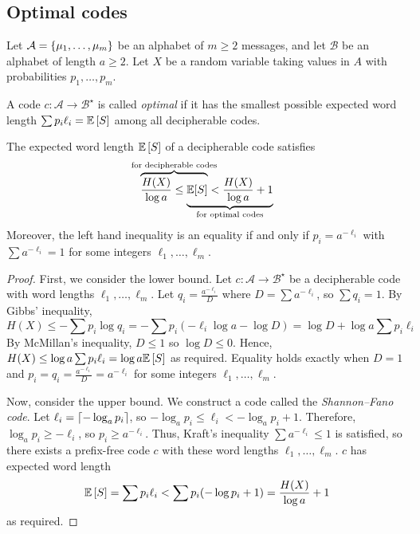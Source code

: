 \subsection{Optimal codes}
Let \( \mathcal A = \qty{\mu_1, \dots, \mu_m} \) be an alphabet of \( m \geq 2 \) messages, and let \( \mathcal B \) be an alphabet of length \( a \geq 2 \).
Let \( X \) be a random variable taking values in \( A \) with probabilities \( p_1, \dots, p_m \).
\begin{definition}
    A code \( c \colon \mathcal A \to \mathcal B^\star \) is called \emph{optimal} if it has the smallest possible expected word length \( \sum p_i \ell_i = \mathbb{E}\left[{S}\right] \) among all decipherable codes.
\end{definition}
\begin{theorem}
    The expected word length \( \mathbb{E}\left[{S}\right] \) of a decipherable code satisfies
    \[ \rlap{\(\overbrace{\phantom{\frac{H(X)}{\log a} \leq \mathbb E[S]}}^{\mathclap{\text{for decipherable codes}}}\)} \frac{H(X)}{\log a} \leq \underbrace{\mathbb E[S] < \frac{H(X)}{\log a} + 1}_{\mathclap{\text{for optimal codes}}} \]
    Moreover, the left hand inequality is an equality if and only if \( p_i = a^{-\ell_i} \) with \( \sum a^{-\ell_i} = 1 \) for some integers \( \ell_1, \dots, \ell_m \).
\end{theorem}
\begin{proof}
    First, we consider the lower bound.
    Let \( c \colon \mathcal A \to \mathcal B^\star \) be a decipherable code with word lengths \( \ell_1, \dots, \ell_m \).
    Let \( q_i = \frac{a^{-\ell_i}}{D} \) where \( D = \sum a^{-\ell_i} \), so \( \sum q_i = 1 \).
    By Gibbs' inequality,
    \[ H(X) \leq -\sum p_i \log q_i = -\sum p_i(-\ell_i \log a - \log D) = \log D + \log a \sum p_i \ell_i \]
    By McMillan's inequality, \( D \leq 1 \) so \( \log D \leq 0 \).
    Hence, \( H(X) \leq \log a \sum p_i \ell_i = \log a \mathbb{E}\left[{S}\right] \) as required.
    Equality holds exactly when \( D = 1 \) and \( p_i = q_i = \frac{a^{-\ell_i}}{D} = a^{-\ell_i} \) for some integers \( \ell_1, \dots, \ell_m \).

    Now, consider the upper bound.
    We construct a code called the \emph{Shannon--Fano code}.
    Let \( \ell_i = \lceil-\log_a p_i\rceil \), so \( -\log_a p_i \leq \ell_i < -\log_a p_i + 1 \).
    Therefore, \( \log_a p_i \geq -\ell_i \), so \( p_i \geq a^{-\ell_i} \).
    Thus, Kraft's inequality \( \sum a^{-\ell_i} \leq 1 \) is satisfied, so there exists a prefix-free code \( c \) with these word lengths \( \ell_1, \dots, \ell_m \).
    \( c \) has expected word length
    \[ \mathbb{E}\left[{S}\right] = \sum p_i \ell_i < \sum p_i (-\log p_i + 1) = \frac{H(X)}{\log a} + 1 \]
    as required.
\end{proof}
